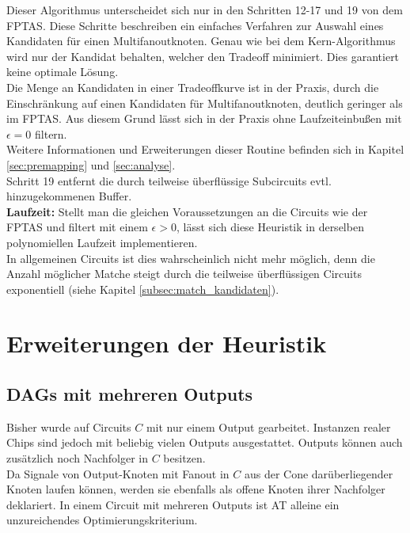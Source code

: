 \documentclass[11pt, a4paper, german]{article}
\begin{document}
Dieser Algorithmus unterscheidet sich nur in den Schritten 12-17 und 19 von dem FPTAS. Diese Schritte beschreiben ein einfaches Verfahren zur Auswahl eines Kandidaten für einen Multifanoutknoten. Genau wie bei dem  Kern-Algorithmus wird nur der Kandidat behalten, welcher den Tradeoff minimiert. Dies garantiert keine optimale Lösung. \\
Die Menge an Kandidaten in einer Tradeoffkurve ist in der Praxis, durch die Einschränkung auf einen Kandidaten für Multifanoutknoten, deutlich geringer als im FPTAS. Aus diesem Grund lässt sich in der Praxis ohne Laufzeiteinbußen mit $\epsilon = 0$ filtern.\\ 
Weitere Informationen und Erweiterungen dieser Routine befinden sich in Kapitel \ref{sec:premapping} und \ref{sec:analyse}. \\
Schritt 19 entfernt die durch teilweise überflüssige Subcircuits evtl. hinzugekommenen Buffer.\\

{\bf Laufzeit: } Stellt man die gleichen Voraussetzungen an die Circuits wie der FPTAS und filtert mit einem $\epsilon  > 0$, lässt sich diese Heuristik in derselben polynomiellen Laufzeit implementieren.\\
In allgemeinen Circuits ist dies wahrscheinlich nicht mehr möglich, denn die Anzahl möglicher Matche steigt durch die teilweise überflüssigen Circuits exponentiell  (siehe Kapitel \ref{subsec:match_kandidaten}).


\section{Erweiterungen der Heuristik}
\label{sec:erw_der_heuristik}
\subsection{DAGs mit mehreren Outputs}
\label{sec:outputs}
Bisher wurde auf Circuits $C$ mit nur einem Output gearbeitet. Instanzen realer Chips sind jedoch mit beliebig vielen Outputs ausgestattet. Outputs können auch zusätzlich noch Nachfolger in $C$ besitzen. \\

 Da Signale von Output-Knoten mit Fanout in $C$ aus der Cone darüberlie\-gender Knoten laufen können, werden sie ebenfalls als offene Knoten ihrer Nachfolger deklariert. In einem Circuit mit mehreren Outputs ist AT alleine ein unzureichendes Optimierungskriterium.
\end{document}
